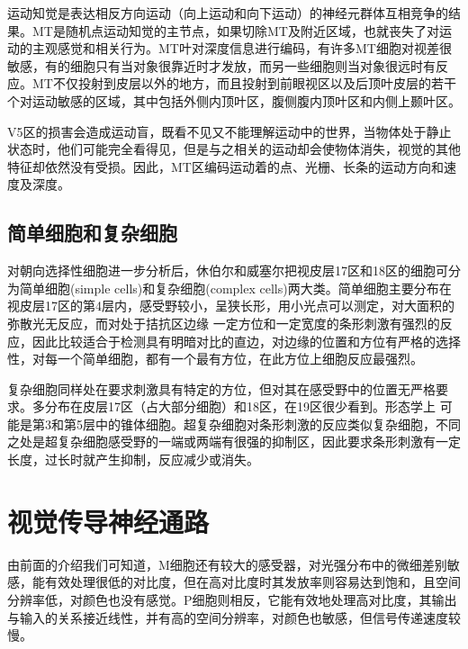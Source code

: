 \documentclass[a4paper,12pt]{article}
\begin{document}
运动知觉是表达相反方向运动（向上运动和向下运动）的神经元群体互相竞争的结果。MT是随机点运动知觉的主节点，如果切除MT及附近区域，也就丧失了对运动的主观感觉和相关行为\cite{15:book}。MT叶对深度信息进行编码，有许多MT细胞对视差很敏感，有的细胞只有当对象很靠近时才发放，而另一些细胞则当对象很远时有反应。MT不仅投射到皮层以外的地方，而且投射到前眼视区以及后顶叶皮层的若干个对运动敏感的区域，其中包括外侧内顶叶区，腹侧腹内顶叶区和内侧上颞叶区。
       


 V5区的损害会造成运动盲\cite{12:book}，既看不见又不能理解运动中的世界，当物体处于静止状态时，他们可能完全看得见，但是与之相关的运动却会使物体消失，视觉的其他特征却依然没有受损。因此，MT区编码运动着的点、光栅、长条的运动方向和速度及深度。


\subsection{简单细胞和复杂细胞}


对朝向选择性细胞进一步分析后，休伯尔和威塞尔把视皮层17区和18区的细胞可分为简单细胞(simple cells)和复杂细胞(complex cells)\cite{12:book}两大类。简单细胞主要分布在视皮层17区的第4层内，感受野较小，呈狭长形，用小光点可以测定，对大面积的弥散光无反应，而对处于拮抗区边缘 一定方位和一定宽度的条形刺激有强烈的反应，因此比较适合于检测具有明暗对比的直边，对边缘的位置和方位有严格的选择性，对每一个简单细胞，都有一个最有方位\cite{15:book}，在此方位上细胞反应最强烈。
       


复杂细胞\cite{15:book}同样处在要求刺激具有特定的方位，但对其在感受野中的位置无严格要求。多分布在皮层17区（占大部分细胞）和18区，在19区很少看到。形态学上 可能是第3和第5层中的锥体细胞。超复杂细胞对条形刺激的反应类似复杂细胞，不同之处是超复杂细胞感受野的一端或两端有很强的抑制区，因此要求条形刺激有一定长度，过长时就产生抑制，反应减少或消失。



\section{视觉传导神经通路}



由前面的介绍我们可知道，M细胞还有较大的感受器，对光强分布中的微细差别敏感，能有效处理很低的对比度，但在高对比度时其发放率则容易达到饱和，且空间分辨率低，对颜色也没有感觉。P细胞则相反，它能有效地处理高对比度，其输出与输入的关系接近线性，并有高的空间分辨率，对颜色也敏感，但信号传递速度较慢\cite{14:misc}。
        
\end{document}
